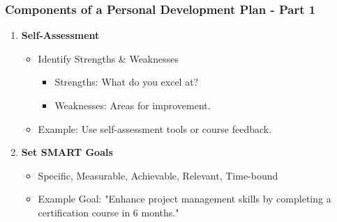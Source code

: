 \documentclass[aspectratio=169]{beamer}
\begin{document}
\begin{frame}[fragile]
    \frametitle{Components of a Personal Development Plan - Part 1}
    \begin{enumerate}
        \item \textbf{Self-Assessment}
            \begin{itemize}
                \item Identify Strengths \& Weaknesses
                    \begin{itemize}
                        \item Strengths: What do you excel at?
                        \item Weaknesses: Areas for improvement.
                    \end{itemize}
                \item Example: Use self-assessment tools or course feedback.
            \end{itemize}
        \item \textbf{Set SMART Goals}
            \begin{itemize}
                \item Specific, Measurable, Achievable, Relevant, Time-bound
                \item Example Goal: "Enhance project management skills by completing a certification course in 6 months."
            \end{itemize}
    \end{enumerate}
\end{frame}
\end{document}

